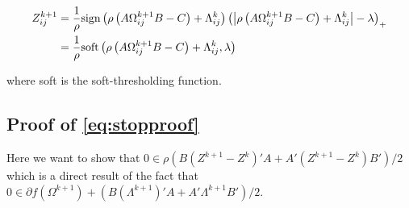 \documentclass[11pt,]{report}
\theoremstyle{definition}
\theoremstyle{definition}
\theoremstyle{definition}
\theoremstyle{remark}
\begin{document}
\begin{equation}
\begin{split}
Z_{ij}^{k + 1} &= \frac{1}{\rho}\mbox{sign}\left(\rho\left(A\Omega_{ij}^{k + 1}B - C\right) + \Lambda_{ij}^{k}\right)\left( \left| \rho\left(A\Omega_{ij}^{k + 1}B - C\right) + \Lambda_{ij}^{k} \right| - \lambda \right)_{+} \\
&= \frac{1}{\rho}\mbox{soft}\left(\rho\left(A\Omega_{ij}^{k + 1}B - C\right) + \Lambda_{ij}^{k}, \lambda\right)
\end{split}
\label{eq:appendixZZproof2}\notag
\end{equation}

where soft is the soft-thresholding function.

\hypertarget{proofstopproof}{%
\subsection{Proof of \eqref{eq:stopproof}}\label{proofstopproof}}

Here we want to show that \(0 \in \rho\left( B(Z^{k + 1} - Z^{k})'A + A'(Z^{k + 1} - Z^{k})B' \right)/2\) which is a direct result of the fact that \(0 \in \partial f\left(\Omega^{k + 1} \right) + \left(B(\Lambda^{k + 1})'A + A'\Lambda^{k + 1}B' \right)/2\).
\end{document}
